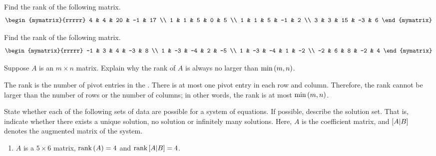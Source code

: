 \begin{enumialphparenastyle}
\begin{ex} Find the rank of the following matrix.
\begin{equation*}
\begin{mymatrix}{rrrrr}
4 & 4 & 20 & -1 & 17 \\
1 & 1 & 5 & 0 & 5 \\
1 & 1 & 5 & -1 & 2 \\
3 & 3 & 15 & -3 & 6
\end{mymatrix}
\end{equation*}
\end{ex}

\begin{ex} Find the rank of the following matrix.
\begin{equation*}
\begin{mymatrix}{rrrrr}
-1 & 3 & 4 & -3 & 8 \\
1 & -3 & -4 & 2 & -5 \\
1 & -3 & -4 & 1 & -2 \\
-2 & 6 & 8 & -2 & 4
\end{mymatrix}
\end{equation*}
\end{ex}

\begin{ex}
  Suppose $A$ is an $m\times n$ matrix. Explain why the rank of $A$ is
  always no larger than $\min \left(m,n\right) $.
  \begin{sol}
    The rank is the number of pivot entries in the {\ef}. There is at
    most one pivot entry in each row and column. Therefore, the rank
    cannot be larger than the number of rows or the number of columns;
    in other words, the rank is at most $\min\left(m,n\right)$.
  \end{sol}
\end{ex}

\begin{ex}
  State whether each of the following sets of data are
  possible for a system of equations. If possible, describe the
  solution set.  That is, indicate whether there exists a unique
  solution, no solution or infinitely many solutions. Here, $A$ is
  the coefficient matrix, and $\left[A|B \right]$ denotes the
  augmented matrix of the system.
  
  \begin{enumerate}
  \item $A$ is a $5\times 6$ matrix, $\mbox{\rm rank}\left(A\right) =4$ and 
    $\mbox{\rm rank}\left[A|B \right] =4$. 
    

\end{enumerate}
\end{ex}
\end{enumialphparenastyle}
